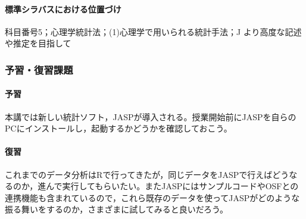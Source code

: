 \paragraph{標準シラバスにおける位置づけ}
科目番号5；心理学統計法；(1)心理学で用いられる統計手法；J より高度な記述や推定を目指して
\subsubsection{予習・復習課題}
\paragraph{予習}本講では新しい統計ソフト，JASPが導入される。授業開始前にJASPを自らのPCにインストールし，起動するかどうかを確認しておこう。
\paragraph{復習}これまでのデータ分析はRで行ってきたが，同じデータをJASPで行えばどうなるのか，進んで実行してもらいたい。またJASPにはサンプルコードやOSFとの連携機能も含まれているので，これら既存のデータを使ってJASPがどのような振る舞いをするのか，さまざまに試してみると良いだろう。
